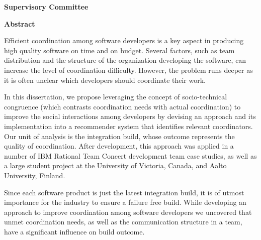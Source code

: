 \newpage
{}

\noindent \textbf{Supervisory Committee}
\tpbreak
\panel

\begin{center}
\textbf{Abstract}
\end{center}
Efficient coordination among software developers is a key aspect in producing high quality software on time and on budget.
Several factors, such as team distribution and the structure of the organization developing the software, can increase the level of coordination difficulty.
However, the problem runs deeper as it is often unclear which developers should coordinate their work.

In this dissertation, we propose leveraging the concept of socio-technical congruence (which contrasts coordination needs with actual coordination) to improve the social interactions among developers 
by devising an approach and its implementation into a recommender system that identifies relevant coordinators.
Our unit of analysis is the integration build, whose outcome represents the quality of coordination.
After development, this approach was applied in a number of IBM Rational Team Concert development team case studies, as well as a large student project at the University of Victoria, Canada, and Aalto University, Finland.

Since each software product is just the latest integration build, it is of utmost importance for the industry to ensure a failure free build.
While developing an approach to improve coordination among software developers we uncovered that unmet coordination needs, as well as the communication structure in a team, have a significant influence on build outcome.